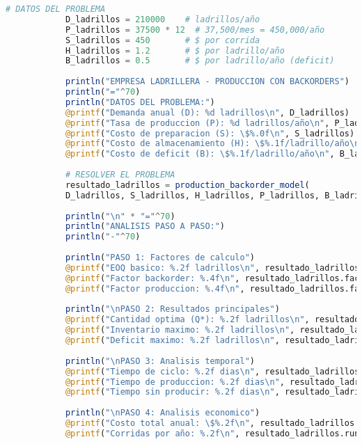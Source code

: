 \documentclass[12pt,a4paper]{book}
\begin{document}
	\begin{tcolorbox}[enhanced,colback=azulclaro,colframe=azulprincipal,boxrule=2pt,arc=8pt,
		title={\bfseries\color{white} \faCode\ SOLUCI\'ON PASO A PASO},breakable]
		
		\begin{lstlisting}[language=Julia,basicstyle=\footnotesize\ttfamily]
			# DATOS DEL PROBLEMA
			D_ladrillos = 210000    # ladrillos/año
			P_ladrillos = 37500 * 12  # 37,500/mes = 450,000/año
			S_ladrillos = 450       # $ por corrida
			H_ladrillos = 1.2       # $ por ladrillo/año
			B_ladrillos = 0.5       # $ por ladrillo/año (deficit)
			
			println("EMPRESA LADRILLERA - PRODUCCION CON BACKORDERS")
			println("="^70)
			println("DATOS DEL PROBLEMA:")
			@printf("Demanda anual (D): %d ladrillos\n", D_ladrillos)
			@printf("Tasa de produccion (P): %d ladrillos/año\n", P_ladrillos)
			@printf("Costo de preparacion (S): \$%.0f\n", S_ladrillos)
			@printf("Costo de almacenamiento (H): \$%.1f/ladrillo/año\n", H_ladrillos)
			@printf("Costo de deficit (B): \$%.1f/ladrillo/año\n", B_ladrillos)
			
			# RESOLVER EL PROBLEMA
			resultado_ladrillos = production_backorder_model(
			D_ladrillos, S_ladrillos, H_ladrillos, P_ladrillos, B_ladrillos)
			
			println("\n" * "="^70)
			println("ANALISIS PASO A PASO:")
			println("-"^70)
			
			println("PASO 1: Factores de calculo")
			@printf("EOQ basico: %.2f ladrillos\n", resultado_ladrillos.Q_base)
			@printf("Factor backorder: %.4f\n", resultado_ladrillos.factor_backorder)
			@printf("Factor produccion: %.4f\n", resultado_ladrillos.factor_production)
			
			println("\nPASO 2: Resultados principales")
			@printf("Cantidad optima (Q*): %.2f ladrillos\n", resultado_ladrillos.Q_star)
			@printf("Inventario maximo: %.2f ladrillos\n", resultado_ladrillos.I_max)
			@printf("Deficit maximo: %.2f ladrillos\n", resultado_ladrillos.deficit_max)
			
			println("\nPASO 3: Analisis temporal")
			@printf("Tiempo de ciclo: %.2f dias\n", resultado_ladrillos.t_cycle)
			@printf("Tiempo de produccion: %.2f dias\n", resultado_ladrillos.t_production)
			@printf("Tiempo sin producir: %.2f dias\n", resultado_ladrillos.t_no_production)
			
			println("\nPASO 4: Analisis economico")
			@printf("Costo total anual: \$%.2f\n", resultado_ladrillos.total_cost)
			@printf("Corridas por año: %.2f\n", resultado_ladrillos.runs_per_year)
			

\end{lstlisting}
\end{tcolorbox}
\end{document}
